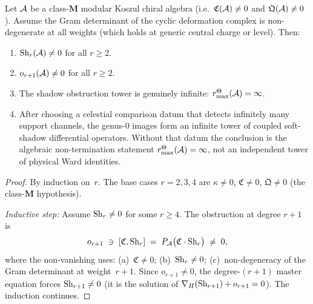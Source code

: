 \begin{proposition}
Let $\mathcal{A}$ be a class-$\mathbf{M}$ modular Koszul chiral algebra
(i.e.\ $\mathfrak{C}(\mathcal{A}) \neq 0$ and $\mathfrak{Q}(\mathcal{A}) \neq 0$).
Assume the Gram determinant of the cyclic deformation complex is
non-degenerate at all weights (which holds at generic central
charge or level). Then:
\begin{enumerate}[label=\textup{(\roman*)}]
\item $\operatorname{Sh}_r(\mathcal{A}) \neq 0$ for all $r \geq 2$.
\item $o_{r+1}(\mathcal{A}) \neq 0$ for all $r \geq 2$.
\item The shadow obstruction tower is genuinely infinite:
 \(r^\Theta_{\max}(\mathcal{A})=\infty\).
\item After choosing a celestial comparison datum that detects
 infinitely many support channels, the genus-$0$ images form an
 infinite tower of coupled soft-shadow differential operators.
 Without that datum the conclusion is the algebraic
 non-termination statement \(r^\Theta_{\max}(\mathcal{A})=\infty\), not an
 independent tower of physical Ward identities.
\end{enumerate}
\end{proposition}

\begin{proof}
By induction on~$r$. The base cases $r = 2, 3, 4$ are
$\kappa \neq 0$, $\mathfrak{C} \neq 0$, $\mathfrak{Q} \neq 0$
(the class-$\mathbf{M}$ hypothesis).

\emph{Inductive step:} Assume $\operatorname{Sh}_r \neq 0$ for some $r \geq 4$.
The obstruction at degree $r+1$ is
\[
o_{r+1}
\;\ni\;
[\mathfrak{C}, \operatorname{Sh}_r]
\;=\;
P_{\mathcal{A}}\bigl(\mathfrak{C} \cdot \operatorname{Sh}_r\bigr)
\;\neq\; 0,
\]
where the non-vanishing uses: (a)~$\mathfrak{C} \neq 0$;
(b)~$\operatorname{Sh}_r \neq 0$; (c)~non-degeneracy of the Gram determinant
at weight~$r+1$.
Since $o_{r+1} \neq 0$, the degree-$(r+1)$ master equation
forces $\operatorname{Sh}_{r+1} \neq 0$ (it is the solution of
$\nabla_H(\operatorname{Sh}_{r+1}) + o_{r+1} = 0$). The induction continues.
\end{proof}

